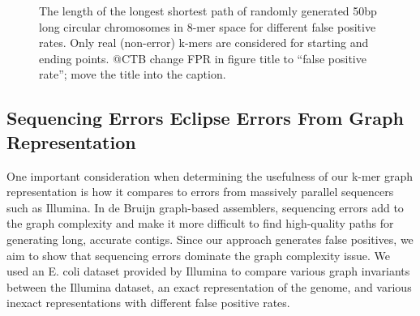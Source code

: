 \documentclass[12pt]{article} \usepackage{simplemargins}
\begin{document}
\begin{figure}
\caption{The length of the longest shortest path of randomly generated 50bp 
long circular chromosomes in 8-mer 
space for different false positive rates. Only real (non-error) k-mers are
considered for starting and ending points.  @CTB change FPR in figure title to ``false positive rate''; move the title into the caption.}
\end{figure}

\subsection{Sequencing Errors Eclipse Errors From Graph Representation}
One important consideration when determining the usefulness of our k-mer
graph representation is how it compares to errors from massively
parallel sequencers such as Illumina. In de Bruijn graph-based
assemblers, sequencing errors add to the graph complexity and make it
more difficult to find high-quality paths for generating long,
accurate contigs. Since our approach generates
false positives, we aim to show that sequencing errors dominate the graph complexity
issue. We used an E. coli dataset provided by Illumina to compare
various graph invariants between the Illumina dataset, an exact
representation of the genome, and various inexact representations with
different false positive rates.
\end{document}
